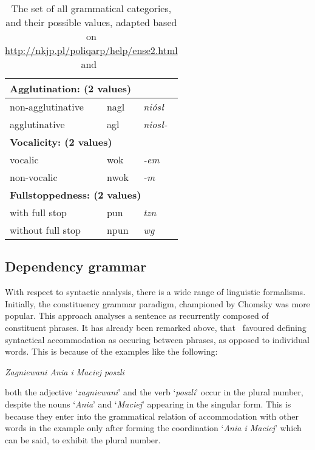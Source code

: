 \documentclass[12pt]{article}
\newcommand{\gloss}[1]{\vspace{10pt}\indent\textit{#1}\vspace{5pt}}
\newcommand{\inlinegloss}[1]{`\textit{#1}'}
\begin{document}
\begin{table}[H]
\begin{tabular}{|l|l|l|}
        \multicolumn{3}{l}{\textbf{Agglutination: (2 values)}}
       \\ \hline
	non-agglutinative & nagl & \textit{niósł}\\ \hline
	agglutinative & agl & \textit{niosł-}\\ \hline
        
        \multicolumn{3}{l}{\textbf{Vocalicity: (2 values)}}
       \\ \hline
	vocalic & wok & \textit{-em}\\ \hline
	non-vocalic & nwok & \textit{-m}\\ \hline
        
        \multicolumn{3}{l}{\textbf{Fullstoppedness: (2 values)}}
       \\ \hline
	with full stop & pun & \textit{tzn}\\ \hline
	without full stop & npun & \textit{wg}\\ \hline
    \end{tabular}
\caption{\label{tagset_table} The set of all grammatical categories, and their possible values, adapted based on \url{http://nkjp.pl/poliqarp/help/ense2.html} and~\cite{kieras:2021}}
\end{table}

\subsection{Dependency grammar}
With respect to syntactic analysis, there is a wide range of linguistic formalisms. Initially, the constituency grammar paradigm, championed by Chomsky was more popular. This approach analyses a sentence as recurrently composed of constituent phrases. It has already been remarked above, that~\cite{saloni:2012} favoured defining syntactical accommodation as occuring between phrases, as opposed to individual words. This is because of the examples like the following:

\gloss{Zagniewani Ania i Maciej poszli}

\noindent both the adjective \inlinegloss{zagniewani} and the verb \inlinegloss{poszli} occur in the plural number, despite the nouns \inlinegloss{Ania} and \inlinegloss{Maciej} appearing in the singular form. This is because they enter into the grammatical relation of accommodation with other words in the example only after forming the coordination \inlinegloss{Ania i Maciej} which can be said, to exhibit the plural number.
\end{document}

